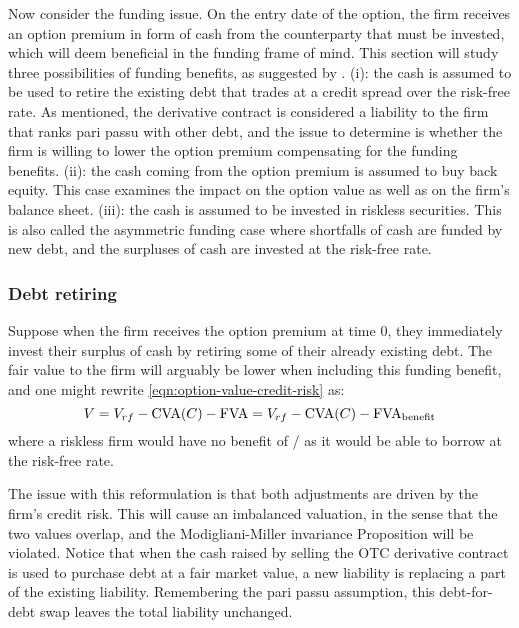 \documentclass[../main.tex]{subfiles}
\begin{document}
        Now consider the funding issue. On the entry date of the option, 
        the firm receives an option premium in form of cash from the counterparty that must be invested, 
        which will deem beneficial in the funding frame of mind. 
        This section will study three possibilities of funding benefits, 
        as suggested by \cite{Hillion2016}.
        (i): the cash is assumed to be used to retire the existing debt 
        that trades at a credit spread over the risk-free rate. 
        As mentioned, the derivative contract is considered a liability to the firm
        that ranks pari passu with other debt, 
        and the issue to determine is whether the firm is willing to lower the option premium 
        compensating for the funding benefits. 
        (ii): the cash coming from the option premium is assumed to buy back equity. 
        This case examines the impact on the option value as well as on the firm's balance sheet. 
        (iii): the cash is assumed to be invested in riskless securities. 
        This is also called the asymmetric funding case where shortfalls of cash are funded by new debt, 
        and the surpluses of cash are invested at the risk-free rate.

        \subsubsection{Debt retiring}
            Suppose when the firm receives the option premium at time 0, 
            they immediately invest their surplus of cash by retiring some of their already existing debt. 
            The fair value to the firm will arguably be lower when including this funding benefit, 
            and one might rewrite \cref{eqn:option-value-credit-risk} as:
            \begin{equation}
                V = V_{rf} - \text{\CVA/}(C) - \text{\FVA/} = V_{rf} - \text{\CVA/}(C) - \text{\FVA/}_{\text{benefit}}
            \end{equation}
            where a riskless firm would have no benefit of \FVA/ as it would be able to borrow at the risk-free rate.
            
            The issue with this reformulation is that both adjustments are driven by the firm's credit risk. 
            This will cause an imbalanced valuation, in the sense that the two values overlap, 
            and the Modigliani-Miller invariance Proposition will be violated. 
            Notice that when the cash raised by selling the OTC derivative contract 
            is used to purchase debt at a fair market value, a new liability is replacing a part of the existing liability. 
            Remembering the pari passu assumption, this debt-for-debt swap leaves the total liability unchanged.
\end{document}
